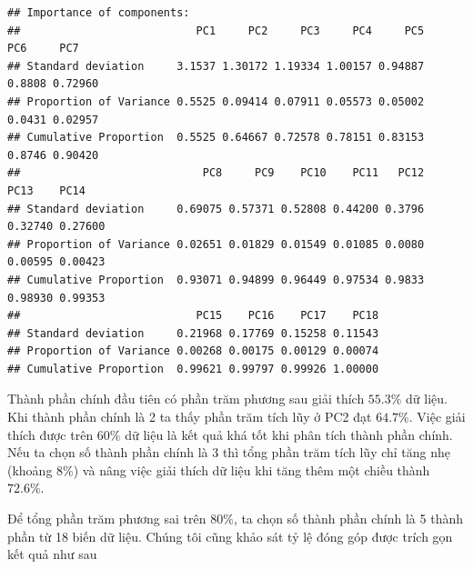 \documentclass[../thesis.tex]{subfiles}
\begin{document}
\begin{Shaded}
	\begin{Highlighting}[]
  \NormalTok{, } \NormalTok{) }\SpecialCharTok{\%\textgreater{}\%} 
	\NormalTok{()}
	\end{Highlighting}
\end{Shaded}

\begin{verbatim}
## Importance of components:
##                           PC1     PC2     PC3     PC4     PC5    PC6     PC7
## Standard deviation     3.1537 1.30172 1.19334 1.00157 0.94887 0.8808 0.72960
## Proportion of Variance 0.5525 0.09414 0.07911 0.05573 0.05002 0.0431 0.02957
## Cumulative Proportion  0.5525 0.64667 0.72578 0.78151 0.83153 0.8746 0.90420
##                            PC8     PC9    PC10    PC11   PC12    PC13    PC14
## Standard deviation     0.69075 0.57371 0.52808 0.44200 0.3796 0.32740 0.27600
## Proportion of Variance 0.02651 0.01829 0.01549 0.01085 0.0080 0.00595 0.00423
## Cumulative Proportion  0.93071 0.94899 0.96449 0.97534 0.9833 0.98930 0.99353
##                           PC15    PC16    PC17    PC18
## Standard deviation     0.21968 0.17769 0.15258 0.11543
## Proportion of Variance 0.00268 0.00175 0.00129 0.00074
## Cumulative Proportion  0.99621 0.99797 0.99926 1.00000
\end{verbatim}


Thành phần chính đầu tiên có phần trăm phương sau giải thích $ 55.3\% $ dữ liệu. Khi thành phần chính là 2 ta thấy phần trăm tích lũy ở \textsf{PC2} đạt $ 64.7\% $. Việc giải thích được trên $ 60\% $ dữ liệu là kết quả khá tốt khi phân tích thành phần chính. Nếu ta chọn số thành phần chính là 3 thì tổng phần trăm tích lũy chỉ tăng nhẹ (khoảng $ 8\% $) và nâng việc giải thích dữ liệu khi tăng thêm một chiều thành $ 72.6\% $. 

Để tổng phần trăm phương sai trên $ 80\% $, ta chọn số thành phần chính là 5 thành phần từ 18 biến dữ liệu. Chúng tôi cũng khảo sát tỷ lệ đóng góp được trích gọn kết quả như sau

\begin{Shaded}
	\begin{Highlighting}[]
 \NormalTok{) }\SpecialCharTok{\%\textgreater{}\%} 
	\NormalTok{()}
	\end{Highlighting}
\end{Shaded}
\end{document}
